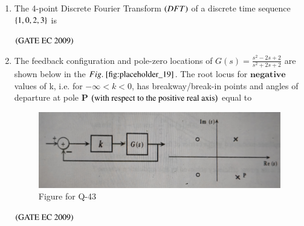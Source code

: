 \documentclass[journal,12pt,onecolumn]{IEEEtran}
\theoremstyle{remark}
\begin{document}
\begin{enumerate}[start=1, label={Q\arabic*.}]
\item The 4-point Discrete Fourier Transform $\left(DFT\right)$ of a discrete time sequence $\left\{1,0,2,3\right\}$ is 
\begin{enumerate}
\end{enumerate}
\hfill $\left(\text{GATE EC 2009}\right)$

\item The feedback configuration and pole-zero locations of $G(s) = \frac{s^2 -2s +2}{s^2 +2s +2}$ are shown below in the $\figref{fig:placeholder_19}$. The root locus for $\textbf{negative}$ values of k, i.e. for $-\infty < k<0$, has breakway/break-in points and angles of departure at pole $\textbf{P}$ $\left(\text{with respect to the positive real axis}\right)$ equal to 
\begin{figure}[H]
    \centering
    \includegraphics[width=0.5\columnwidth]{figs/img_19.jpg}
    \caption{\centering Figure for Q-43}
    \label{fig:placeholder_19}
\end{figure}
\begin{enumerate}
\end{enumerate}
\hfill $\left(\text{GATE EC 2009}\right)$



\end{enumerate}
\end{document}
